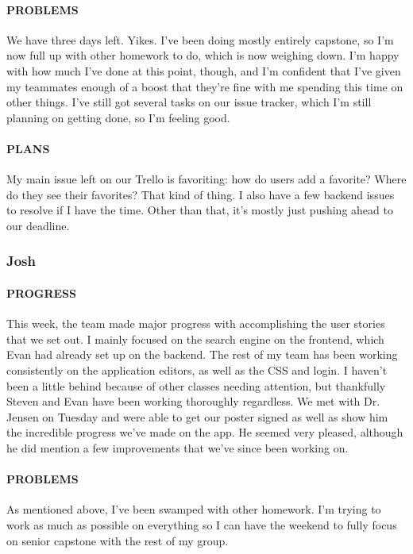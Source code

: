 \documentclass[onecolumn, draftclsnofoot,10pt, compsoc]{IEEEtran}
\begin{document}
	\paragraph{PROBLEMS}
	
	We have three days left. Yikes. I've been doing mostly entirely capstone, so I'm now full up with other homework to do, which is now weighing down. I'm happy with how much I've done at this point, though, and I'm confident that I've given my teammates enough of a boost that they're fine with me spending this time on other things. I've still got several tasks on our issue tracker, which I'm still planning on getting done, so I'm feeling good.
	
	\paragraph{PLANS}
	
	My main issue left on our Trello is favoriting: how do users add a favorite? Where do they see their favorites? That kind of thing. I also have a few backend issues to resolve if I have the time. Other than that, it's mostly just pushing ahead to our deadline.
	
	\subsubsection{Josh}
	
	\paragraph{PROGRESS}
	This week, the team made major progress with accomplishing the user stories that we set out. I mainly focused on the search engine on the frontend, which Evan had already set up on the backend. The rest of my team has been working consistently on the application editors, as well as the CSS and login. I haven't been a little behind because of other classes needing attention, but thankfully Steven and Evan have been working thoroughly regardless. We met with Dr. Jensen on Tuesday and were able to get our poster signed as well as show him the incredible progress we've made on the app. He seemed very pleased, although he did mention a few improvements that we've since been working on. 
	
	\paragraph{PROBLEMS}
	As mentioned above, I've been swamped with other homework. I'm trying to work as much as possible on everything so I can have the weekend to fully focus on senior capstone with the rest of my group. 
	
\end{document}
